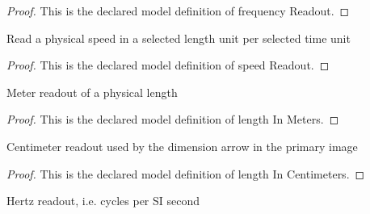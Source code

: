 \begin{proof}
  This is the declared model definition of frequency Readout.
\end{proof}
\begin{definition}
  \label{def:physics:phyx-mini-0176:phyxminiproblems-problemphyxmini0176-speedreadout}
  Read a physical speed in a selected length unit per selected time unit
\end{definition}
\begin{proof}
  This is the declared model definition of speed Readout.
\end{proof}
\begin{definition}
  \label{def:physics:phyx-mini-0176:phyxminiproblems-problemphyxmini0176-lengthinmeters}
  Meter readout of a physical length
\end{definition}
\begin{proof}
  This is the declared model definition of length In Meters.
\end{proof}
\begin{definition}
  \label{def:physics:phyx-mini-0176:phyxminiproblems-problemphyxmini0176-lengthincentimeters}
  Centimeter readout used by the dimension arrow in the primary image
\end{definition}
\begin{proof}
  This is the declared model definition of length In Centimeters.
\end{proof}
\begin{definition}
  \label{def:physics:phyx-mini-0176:phyxminiproblems-problemphyxmini0176-frequencyinhertz}
  Hertz readout, i.e. cycles per SI second
\end{definition}

